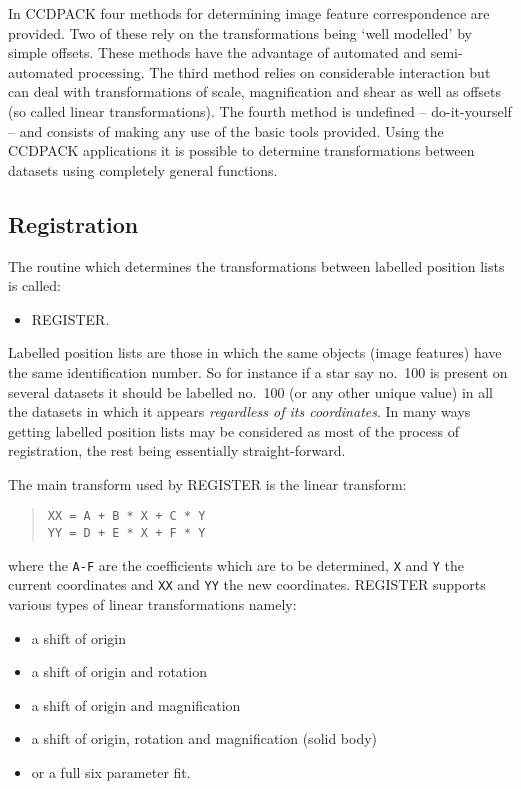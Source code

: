 \documentclass[twoside,11pt]{article}
\newcommand{\htmlref}[2]{#1}
\newcommand{\xlabel}[1]{}
\renewcommand{\_}{\texttt{\symbol{95}}}
\newenvironment{myquote}{\begin{quote}\begin{small}}{\end{small}\end{quote}}
\newcommand{\text}[1]{{\small \tt #1}}
\newcommand{\routine}[1]{{\sc #1}}
\newcommand{\xroutine}[1]{\htmlref{{\sc #1}}{#1}}
\begin{document}
In CCDPACK four methods for determining image feature correspondence
are provided. Two of these rely on the transformations being
`well modelled' by simple offsets. These methods have the advantage of
automated and semi-automated processing. The third method relies on
considerable interaction but can deal with transformations of scale,
magnification and shear as well as offsets (so called linear
transformations). The fourth method is undefined -- do-it-yourself --
and consists of making any use of the basic tools provided. Using the
CCDPACK applications it is possible to determine transformations
between datasets using completely general functions.

\subsection{\xlabel{registration}Registration}

The routine which determines the transformations between labelled
position lists is called:
\begin{itemize}
\item \xroutine{REGISTER}.
\end{itemize}
Labelled position lists are those in which the same objects (image
features) have the same identification number. So for instance if a
star say no.\ 100 is present on several datasets it should be labelled
no.\ 100 (or any other unique value) in all the datasets in which it
appears {\em regardless of its coordinates}. In many ways getting
labelled position lists may be considered as most of the process of
registration, the rest being essentially straight-forward.

The main transform used by \routine{REGISTER} is the linear transform:
\begin{myquote}
\begin{verbatim}
XX = A + B * X + C * Y
YY = D + E * X + F * Y
\end{verbatim}
\end{myquote}
where the \text{A-F} are the coefficients which are to be
determined, \text{X} and \text{Y} the current coordinates and
\text{XX} and \text{YY} the new coordinates. \routine{REGISTER} supports
various types of linear transformations namely:
\begin{itemize}
\item a shift of origin
\item a shift of origin and rotation
\item a shift of origin and magnification
\item a shift of origin, rotation and magnification (solid body)
\item or a full six parameter fit.
\end{itemize}
\end{document}
